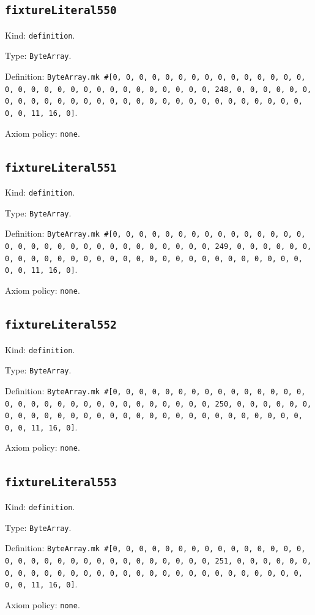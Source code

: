 \documentclass[11pt]{article}
\begin{document}
\subsection*{\texttt{fixtureLiteral550}}
\noindent Kind: \texttt{definition}.\par
\noindent Type: \texttt{ByteArray}.\par
\noindent Definition: \texttt{ByteArray.mk \#[0, 0, 0, 0, 0, 0, 0, 0, 0, 0, 0, 0, 0, 0, 0, 0, 0, 0, 0, 0, 0, 0, 0, 0, 0, 0, 0, 0, 0, 0, 0, 248, 0, 0, 0, 0, 0, 0, 0, 0, 0, 0, 0, 0, 0, 0, 0, 0, 0, 0, 0, 0, 0, 0, 0, 0, 0, 0, 0, 0, 0, 0, 0, 11, 16, 0]}.\par
\noindent Axiom policy: \texttt{none}.\par
\subsection*{\texttt{fixtureLiteral551}}
\noindent Kind: \texttt{definition}.\par
\noindent Type: \texttt{ByteArray}.\par
\noindent Definition: \texttt{ByteArray.mk \#[0, 0, 0, 0, 0, 0, 0, 0, 0, 0, 0, 0, 0, 0, 0, 0, 0, 0, 0, 0, 0, 0, 0, 0, 0, 0, 0, 0, 0, 0, 0, 249, 0, 0, 0, 0, 0, 0, 0, 0, 0, 0, 0, 0, 0, 0, 0, 0, 0, 0, 0, 0, 0, 0, 0, 0, 0, 0, 0, 0, 0, 0, 0, 11, 16, 0]}.\par
\noindent Axiom policy: \texttt{none}.\par
\subsection*{\texttt{fixtureLiteral552}}
\noindent Kind: \texttt{definition}.\par
\noindent Type: \texttt{ByteArray}.\par
\noindent Definition: \texttt{ByteArray.mk \#[0, 0, 0, 0, 0, 0, 0, 0, 0, 0, 0, 0, 0, 0, 0, 0, 0, 0, 0, 0, 0, 0, 0, 0, 0, 0, 0, 0, 0, 0, 0, 250, 0, 0, 0, 0, 0, 0, 0, 0, 0, 0, 0, 0, 0, 0, 0, 0, 0, 0, 0, 0, 0, 0, 0, 0, 0, 0, 0, 0, 0, 0, 0, 11, 16, 0]}.\par
\noindent Axiom policy: \texttt{none}.\par
\subsection*{\texttt{fixtureLiteral553}}
\noindent Kind: \texttt{definition}.\par
\noindent Type: \texttt{ByteArray}.\par
\noindent Definition: \texttt{ByteArray.mk \#[0, 0, 0, 0, 0, 0, 0, 0, 0, 0, 0, 0, 0, 0, 0, 0, 0, 0, 0, 0, 0, 0, 0, 0, 0, 0, 0, 0, 0, 0, 0, 251, 0, 0, 0, 0, 0, 0, 0, 0, 0, 0, 0, 0, 0, 0, 0, 0, 0, 0, 0, 0, 0, 0, 0, 0, 0, 0, 0, 0, 0, 0, 0, 11, 16, 0]}.\par
\noindent Axiom policy: \texttt{none}.\par
\end{document}
